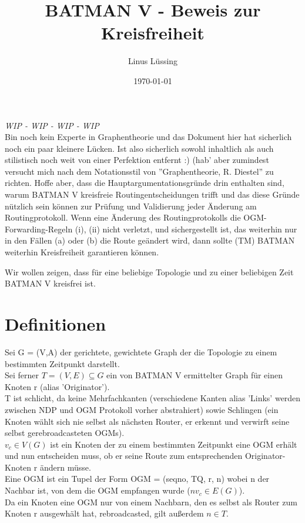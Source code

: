 \documentclass[a4paper,10pt]{scrartcl}[2003/01/01] %
\title{BATMAN V - Beweis zur Kreisfreiheit}
\author{Linus Lüssing}
\date{\textcopyleft\today}
\begin{document}
\maketitle

\emph{WIP - WIP - WIP - WIP} \\
Bin noch kein Experte in Graphentheorie und das Dokument hier hat sicherlich noch
ein paar kleinere Lücken. Ist also sicherlich sowohl inhaltlich als auch stilistisch
noch weit von einer Perfektion entfernt :) (hab' aber zumindest versucht mich nach dem
Notationsstil von ''Graphentheorie, R. Diestel'' zu richten. Hoffe aber, dass die Hauptargumentationsgründe
drin enthalten sind, warum BATMAN V kreisfreie Routingentscheidungen trifft und das
diese Gründe nützlich sein können zur Prüfung und Validierung jeder Änderung am
Routingprotokoll. Wenn eine Änderung des Routingprotokolls die OGM-Forwarding-Regeln (i), (ii) nicht verletzt,
und sichergestellt ist, das weiterhin nur in den Fällen (a) oder (b) die Route geändert wird,
dann sollte (TM) BATMAN weiterhin Kreisfreiheit garantieren können.

\newpage

Wir wollen zeigen, dass für eine beliebige Topologie und zu einer beliebigen Zeit
BATMAN V kreisfrei ist. \\

\section*{Definitionen}

Sei G = (V,A) der gerichtete, gewichtete Graph der die Topologie zu einem
bestimmten Zeitpunkt darstellt. \\

Sei ferner $T = (V,E) \subseteq G$ ein von BATMAN V ermittelter Graph für einen Knoten
r (alias 'Originator'). \\

T ist schlicht, da keine Mehrfachkanten (verschiedene Kanten alias 'Links'
werden zwischen NDP und OGM Protokoll vorher abstrahiert) sowie Schlingen
(ein Knoten wählt sich nie selbst als nächsten Router, er erkennt
und verwirft seine selbst gerebroadcasteten OGMs). \\

$v_c \in V(G)$ ist ein Knoten der zu einem bestimmten Zeitpunkt eine OGM erhält
und nun entscheiden muss, ob er seine Route zum entsprechenden Originator-Knoten r
ändern müsse. \\

Eine OGM ist ein Tupel der Form OGM = (seqno, TQ, r, n) wobei n der Nachbar ist,
von dem die OGM empfangen wurde ($nv_c \in E(G)$). \\
Da ein Knoten eine OGM nur von einem Nachbarn, den es selbst als Router zum Knoten
r ausgewhält hat, rebroadcasted, gilt außerdem $n \in T$. \\
\end{document}
